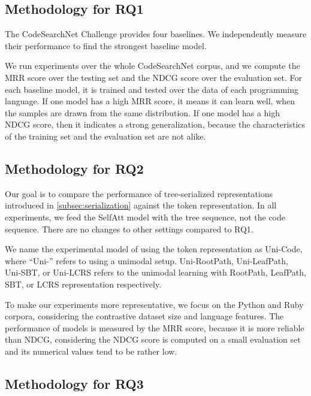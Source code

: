 \documentclass[conference]{IEEEtran}
\begin{document}
\subsection{Methodology for RQ1}
\label{subsec:mrq1}

\emph{\rqaaa}

The CodeSearchNet Challenge provides four baselines. We independently measure their performance to find the strongest baseline model.

We run experiments over the whole CodeSearchNet corpus, and we compute the MRR score over the testing set and the NDCG score over the evaluation set. For each baseline model, it is trained and tested over the data of each programming language. If one model has a high MRR score, it means it can learn well, when the samples are drawn from the same distribution. If one model has a high NDCG score, then it indicates a strong generalization, because the characteristics of the training set and the evaluation set are not alike.


\subsection{Methodology for RQ2}
\label{subsec:mrq2}

\emph{\rqbbb}

Our goal is to compare the performance of tree-serialized representations introduced in \autoref{subsec:serialization} against the token representation. In all experiments, we feed the SelfAtt model with the tree sequence, not the code sequence. There are no changes to other settings compared to RQ1.

We name the experimental model of using the token representation as Uni-Code, where ``Uni-'' refers to using a unimodal setup. Uni-RootPath, Uni-LeafPath, Uni-SBT, or Uni-LCRS refers to the unimodal learning with RootPath, LeafPath, SBT, or LCRS representation respectively.

To make our experiments more representative, we focus on the Python and Ruby corpora, considering the contrastive dataset size and language features. The performance of models is measured by the MRR score, because it is more reliable than NDCG, considering the NDCG score is computed on a small evaluation set and its numerical values tend to be rather low.

\subsection{Methodology for RQ3}
\label{subsec:mrq3}
\end{document}
